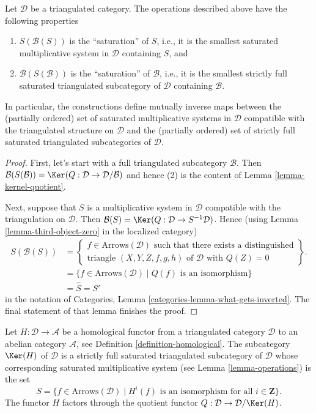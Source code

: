 \begin{lemma}
\label{lemma-operations}
Let $\mathcal{D}$ be a triangulated category. The operations described above
have the following properties
\begin{enumerate}
\item $S(\mathcal{B}(S))$ is the ``saturation'' of $S$, i.e., it is the
smallest saturated multiplicative system in $\mathcal{D}$ containing $S$, and
\item $\mathcal{B}(S(\mathcal{B}))$ is the ``saturation'' of $\mathcal{B}$,
i.e., it is the smallest strictly full saturated triangulated subcategory of
$\mathcal{D}$ containing $\mathcal{B}$.
\end{enumerate}
In particular, the constructions define mutually inverse maps between
the (partially ordered) set of saturated multiplicative systems in
$\mathcal{D}$ compatible with the triangulated structure on $\mathcal{D}$
and
the (partially ordered) set of strictly full saturated triangulated
subcategories of $\mathcal{D}$.
\end{lemma}

\begin{proof}
First, let's start with a full triangulated subcategory $\mathcal{B}$. Then
$\mathcal{B}(S(\mathcal{B})) =
\Ker(Q : \mathcal{D} \to \mathcal{D}/\mathcal{B})$
and hence (2) is the content of
Lemma \ref{lemma-kernel-quotient}.

\medskip\noindent
Next, suppose that $S$ is a multiplicative system in $\mathcal{D}$ compatible
with the triangulation on $\mathcal{D}$. Then
$\mathcal{B}(S) = \Ker(Q : \mathcal{D} \to S^{-1}\mathcal{D})$.
Hence (using
Lemma \ref{lemma-third-object-zero}
in the localized category)
\begin{align*}
S(\mathcal{B}(S))
& =
\left\{
\begin{matrix}
f \in \text{Arrows}(\mathcal{D})
\text{ such that there exists a distinguished}\\
\text{triangle }(X, Y, Z, f, g, h) \text{ of }\mathcal{D}\text{ with }Q(Z) = 0
\end{matrix}
\right\}.
\\
& =
\{f \in \text{Arrows}(\mathcal{D}) \mid Q(f)\text{ is an isomorphism}\} \\
& = \hat S = S'
\end{align*}
in the notation of
Categories, Lemma \ref{categories-lemma-what-gets-inverted}.
The final statement of that lemma finishes the proof.
\end{proof}

\begin{lemma}
\label{lemma-acyclic-general}
Let $H : \mathcal{D} \to \mathcal{A}$ be a homological functor from a
triangulated category $\mathcal{D}$ to an abelian category $\mathcal{A}$, see
Definition \ref{definition-homological}.
The subcategory $\Ker(H)$ of $\mathcal{D}$ is a strictly full
saturated triangulated subcategory of $\mathcal{D}$ whose corresponding
saturated multiplicative system (see
Lemma \ref{lemma-operations})
is the set
$$
S = \{f \in \text{Arrows}(\mathcal{D}) \mid
H^i(f)\text{ is an isomorphism for all }i \in \mathbf{Z}\}.
$$
The functor $H$ factors through the quotient functor
$Q : \mathcal{D} \to \mathcal{D}/\Ker(H)$.
\end{lemma}

